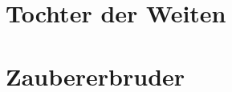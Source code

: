 \documentclass{article}
\begin{document}
    \section{Tochter der Weiten}
    
     \section{Zaubererbruder}
     
\end{document}
